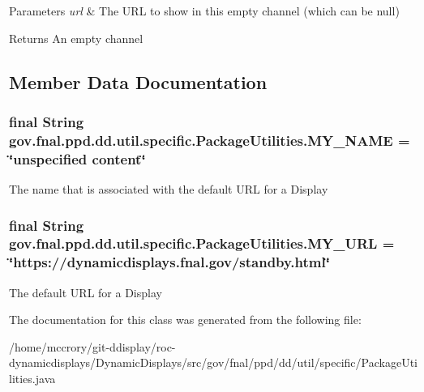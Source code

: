\begin{DoxyParams}{Parameters}
{\em url} & The U\-R\-L to show in this empty channel (which can be null) \\
\hline
\end{DoxyParams}
\begin{DoxyReturn}{Returns}
An empty channel 
\end{DoxyReturn}


\subsection{Member Data Documentation}
\hypertarget{classgov_1_1fnal_1_1ppd_1_1dd_1_1util_1_1specific_1_1PackageUtilities_a150f5e795e043d677c508269d554d74e}{
\subsubsection[{M\-Y\-\_\-\-N\-A\-M\-E}]{\setlength{\rightskip}{0pt plus 5cm}final String gov.\-fnal.\-ppd.\-dd.\-util.\-specific.\-Package\-Utilities.\-M\-Y\-\_\-\-N\-A\-M\-E = \char`\"{}unspecified content\char`\"{}\hspace{0.3cm}{\ttfamily [static]}}}\label{classgov_1_1fnal_1_1ppd_1_1dd_1_1util_1_1specific_1_1PackageUtilities_a150f5e795e043d677c508269d554d74e}
The name that is associated with the default U\-R\-L for a Display \hypertarget{classgov_1_1fnal_1_1ppd_1_1dd_1_1util_1_1specific_1_1PackageUtilities_a2c28b8b9f5e920adc416d0fb452c4a15}{
\subsubsection[{M\-Y\-\_\-\-U\-R\-L}]{\setlength{\rightskip}{0pt plus 5cm}final String gov.\-fnal.\-ppd.\-dd.\-util.\-specific.\-Package\-Utilities.\-M\-Y\-\_\-\-U\-R\-L = \char`\"{}https\-://dynamicdisplays.\-fnal.\-gov/standby.\-html\char`\"{}\hspace{0.3cm}{\ttfamily [static]}}}\label{classgov_1_1fnal_1_1ppd_1_1dd_1_1util_1_1specific_1_1PackageUtilities_a2c28b8b9f5e920adc416d0fb452c4a15}
The default U\-R\-L for a Display 

The documentation for this class was generated from the following file\-:\begin{DoxyCompactItemize}
\item 
/home/mccrory/git-\/ddisplay/roc-\/dynamicdisplays/\-Dynamic\-Displays/src/gov/fnal/ppd/dd/util/specific/Package\-Utilities.\-java\end{DoxyCompactItemize}
